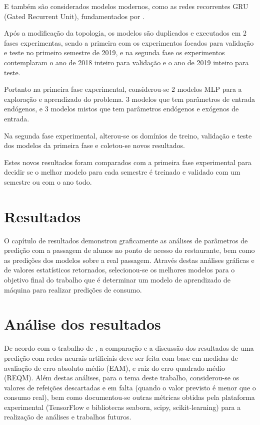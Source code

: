 \documentclass[	12pt, Times, openright, twoside, a4paper, english, brazil]{abntex2}
\begin{document}
          E também são considerados modelos modernos, como as redes recorrentes GRU (Gated Recurrent Unit), fundamentados por \cite{DLB}.

          Após a modificação da topologia, os modelos são duplicados e executados em 2 fases experimentas, sendo a primeira com os experimentos focados para validação e teste no primeiro semestre de 2019, e na segunda fase os experimentos contemplaram o ano de 2018 inteiro para validação e o ano de 2019 inteiro para teste.
          
          Portanto na primeira fase experimental,  considerou-se 2 modelos MLP para a exploração e aprendizado do problema.
          3 modelos que tem parâmetros de entrada endógenos, e 3 modelos mistos que tem parâmetros endógenos e exógenos de entrada.
          
          Na segunda fase experimental, alterou-se os domínios de treino, validação e teste dos modelos da primeira fase e coletou-se novos resultados.
          
          Estes novos resultados foram comparados com a primeira fase experimental para decidir se o melhor modelo para cada semestre é treinado e validado com um semestre ou com o ano todo.
        
        \section{Resultados} %
            O capítulo de resultados demonstrou graficamente as análises de parâmetros de predição com a passagem de alunos no ponto de acesso do restaurante, bem como as predições dos modelos sobre a real passagem.
            Através destas análises gráficas e de valores estatísticos retornados, selecionou-se os melhores modelos para o objetivo final do trabalho que é determinar um modelo de aprendizado de máquina para realizar predições de consumo.
        
        \section{Análise dos resultados}
            De acordo com  o trabalho de \cite{Flavia2014}, a comparação e a discussão dos resultados de uma predição com redes neurais artificiais deve ser feita com base em medidas de avaliação de erro absoluto médio (EAM), e raiz do erro quadrado médio (REQM). 
            Além destas análises, para o tema deste trabalho, considerou-se os valores de refeições descartadas e em falta (quando o valor previsto é menor que o consumo real), bem como documentou-se outras métricas obtidas pela plataforma experimental (TensorFlow e bibliotecas seaborn, scipy, scikit-learning) para a realização de análises e trabalhos futuros.
        
\end{document}
